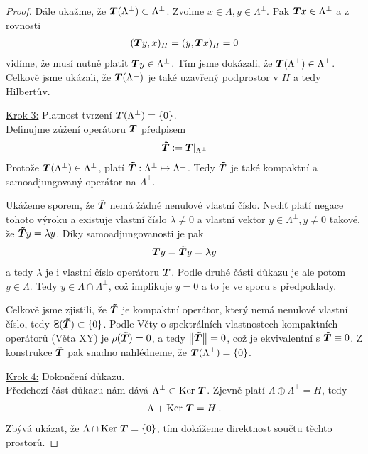 \begin{proof}
Dále ukažme, že $\boldsymbol{T}(\Lambda^\bot) \subset \Lambda^\bot$. Zvolme $x \in \Lambda, y \in \Lambda^\bot$. Pak $\boldsymbol{T} x \in \Lambda^\bot$ a z rovnosti \begin{align*}
    (\boldsymbol{T} y,x)_H = (y, \boldsymbol{T} x)_H =0
\end{align*}
vidíme, že musí nutně platit $\boldsymbol{T} y \in \Lambda^\bot$. Tím jsme dokázali, že $\boldsymbol{T}(\Lambda^\bot) \in \Lambda^{\bot}$. Celkově jsme ukázali, že  $\boldsymbol{T}(\Lambda^\bot)$ je také uzavřený podprostor v $H$ a tedy Hilbertův.

\underline{Krok 3:} Platnost tvrzení $\boldsymbol{T}(\Lambda^\bot) = \lbrace 0 \rbrace$. \\
Definujme zúžení operátoru $\boldsymbol{T}$ předpisem \begin{align*}
    \boldsymbol{\tilde T} := \boldsymbol{T}\rvert_{\Lambda^\bot}
\end{align*}
Protože $\boldsymbol{T}(\Lambda^\bot) \in \Lambda^{\bot}$, platí $\boldsymbol{\tilde T} : \Lambda^{\bot} \mapsto \Lambda^{\bot}$. Tedy $\boldsymbol{\tilde T}$ je také kompaktní a samoadjungovaný operátor na $\Lambda^{\bot}$.

Ukážeme sporem, že $\boldsymbol{\tilde T}$ nemá žádné nenulové vlastní číslo. Nechť platí negace tohoto výroku a existuje vlastní číslo $\lambda \neq 0$ a vlastní vektor $y \in \Lambda^{\bot} , y \neq 0$ takové, že $ \boldsymbol{\tilde T} y = \lambda y$. Díky samoadjungovanosti je pak \begin{align*}
    \boldsymbol{T} y = \boldsymbol{\tilde T} y = \lambda y
\end{align*}
a tedy $\lambda$ je i vlastní číslo operátoru $\boldsymbol{T}$. Podle druhé části důkazu je ale potom $y \in \Lambda$. Tedy $y \in \Lambda \cap \Lambda^\bot$, což implikuje $y=0$ a to je ve sporu s předpoklady.

Celkově jsme zjistili, že $\boldsymbol{\tilde T}$ je kompaktní operátor, který nemá nenulové vlastní číslo, tedy $\Sp(\map{\tilde T}) \subset \{ 0 \}$. Podle Věty o spektrálních vlastnostech kompaktních operátorů (Věta XY) je $\rho(\boldsymbol{\tilde T}) = 0$, a tedy  $\left\lVert\boldsymbol{\tilde T}\right\rVert =0$, což je ekvivalentní s $\boldsymbol{\tilde T} \equiv 0$. Z konstrukce $\boldsymbol{\tilde T}$ pak snadno nahlédneme, že $\boldsymbol{T}(\Lambda^\bot)= \{0 \}$.

\underline{Krok 4:} Dokončení důkazu. \\
Předchozí část důkazu nám dává $\Lambda^\bot \subset \operatorname{Ker}\, \boldsymbol{T}$. Zjevně platí $\Lambda \oplus \Lambda^\bot = H$, tedy \begin{align*}
    \Lambda + \operatorname{Ker}\, \boldsymbol{T} = H \:.
\end{align*}
Zbývá ukázat, že $\Lambda \cap \operatorname{Ker}\, \boldsymbol{T} = \{0 \}$, tím dokážeme direktnost součtu těchto prostorů.


\end{proof}
